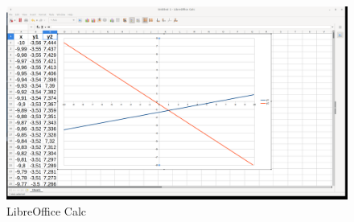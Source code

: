 \begin{figure}[h!]		
	\centering
   	\includegraphics[width=8.0in]{pictures/picture_021.png}
  	\caption{LibreOffice Calc}
   	\label{fig:LibreOfficeCalc021}
\end{figure}